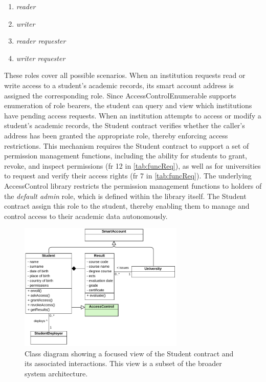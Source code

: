 \begin{enumerate}
    \item \textit{reader}
    \item \textit{writer}
    \item \textit{reader requester}
    \item \textit{writer requester}
\end{enumerate}
These roles cover all possible scenarios. When an institution requests read or write access to a student's academic records,  its smart account address is assigned the corresponding role. Since AccessControlEnumerable supports enumeration of role bearers, the student can query and view which institutions have pending access requests. 
When an institution attempts to access or modify a student's academic records, the Student contract verifies whether the caller's address has been granted the appropriate role, thereby enforcing access restrictions. This mechanism requires the Student contract to support a set of permission management functions, including the ability for students to grant, revoke, and inspect permissions (\gls{fr} 12 in \cref{tab:funcReq}), as well as for universities to request and verify their access rights (\gls{fr} 7 in \cref{tab:funcReq}).
The underlying AccessControl library restricts the permission management functions to holders of the \textit{default admin} role, which is defined within the library itself. The Student contract assign this role to the student, thereby enabling them to manage and control access to their academic data autonomously. 
\begin{figure}
  \centering
  \includegraphics[width=0.7\textwidth]{figures/Student class diagram.pdf}
  \caption[Class diagram focused on Student contract]{Class diagram showing a focused view of the Student contract and its associated interactions. This view is a subset of the broader system architecture.}
  \label{fig:studentContractClass}
\end{figure}

